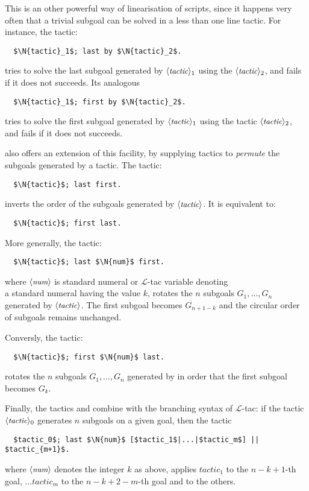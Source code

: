 This is an other powerful way of linearisation of scripts, since it
happens very often that a trivial subgoal can be solved in a less than
one line tactic. For instance, the tactic:
\begin{lstlisting}
  $\N{tactic}_1$; last by $\N{tactic}_2$.
\end{lstlisting}
tries to solve the last subgoal generated by $\langle\mbox{\itshape\rmfamily\small tactic}\rangle_1$ using the
$\langle\mbox{\itshape\rmfamily\small tactic}\rangle_2$, and fails if it does not succeeds. Its analogous
\begin{lstlisting}
  $\N{tactic}_1$; first by $\N{tactic}_2$.
\end{lstlisting}
tries to solve the first subgoal generated by $\langle\mbox{\itshape\rmfamily\small tactic}\rangle_1$ using the
tactic $\langle\mbox{\itshape\rmfamily\small tactic}\rangle_2$, and fails if it does not succeeds.


\ssr{} also offers an extension of this facility, by supplying
tactics to \emph{permute}  the subgoals generated by a tactic. 
The tactic:
\begin{lstlisting}
  $\N{tactic}$; last first.
\end{lstlisting}
inverts the order of the subgoals generated by $\langle\mbox{\itshape\rmfamily\small tactic}\rangle$. It is
equivalent to:
\begin{lstlisting}
  $\N{tactic}$; first last.
\end{lstlisting}

More generally, the tactic:
\begin{lstlisting}
  $\N{tactic}$; last $\N{num}$ first.
\end{lstlisting}
where $\langle\mbox{\itshape\rmfamily\small num}\rangle$ is 
standard \Coq{} numeral or $\mathcal{L}$-tac variable denoting\\
a standard \Coq{} numeral having the value $k$,
rotates the $n$ subgoals $G_1,
\dots, G_n$ generated by $\langle\mbox{\itshape\rmfamily\small tactic}\rangle$. The first subgoal becomes
$G_{n + 1 - k}$ and the circular order of subgoals remains unchanged. 

Conversly, the tactic:
\begin{lstlisting}
  $\N{tactic}$; first $\N{num}$ last.
\end{lstlisting}
rotates the $n$ subgoals $G_1,
\dots, G_n$ generated by  in order that the first subgoal
becomes $G_{k}$.

Finally, the tactics  and  combine with the
branching syntax of $\mathcal{L}$-tac: 
if the tactic $\langle\mbox{\itshape\rmfamily\small tactic}\rangle_0$ generates $n$
subgoals on a given goal, then the tactic
\begin{lstlisting}
  $tactic_0$; last $\N{num}$ [$tactic_1$|...|$tactic_m$] || $tactic_{m+1}$.
\end{lstlisting}
where $\langle\mbox{\itshape\rmfamily\small num}\rangle$ denotes the integer $k$ as above, applies $tactic_1$ to the
$n -k + 1$-th goal, $\dots tactic_m$ to the $n -k + 2 - m$-th
goal and  to the others.

